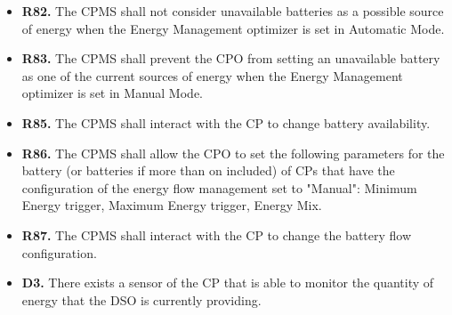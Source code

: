 \documentclass{Configuration_Files/PoliMi3i_thesis}
\begin{document}
\begin{enumerate}[label=\textbf{G\arabic*}]
\begin{itemize}
            \item \textbf{R82.} The CPMS shall not consider unavailable batteries as  a possible source of energy when the Energy Management optimizer is set in Automatic Mode.
            \item \textbf{R83.} The CPMS shall prevent the CPO from setting an unavailable battery as one of the current sources of energy when the Energy Management optimizer is set in Manual Mode.
            \item \textbf{R85.} The CPMS shall interact with the CP to change battery availability.
            \item \textbf{R86.} The CPMS shall allow the CPO to set the following  parameters for the battery (or batteries if more than on included) of CPs that have the configuration of the energy flow management set to  "Manual": Minimum Energy trigger, Maximum Energy trigger, Energy Mix.
            \item \textbf{R87.} The CPMS shall interact with the CP to change the battery flow configuration.
            \item \textbf{D3.} There exists a sensor of the CP that is able to monitor the quantity of energy that the DSO is currently providing.
        \end{itemize}


\end{enumerate}
\end{document}
